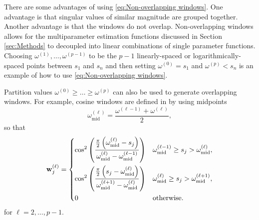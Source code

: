 \documentclass[12pt]{article}
\newcommand{\wVec}{\mathbf{w}}	%
\newcommand{\partition}{\omega}  %
\newcommand{\midpoint}{\partition_{\text{mid}}}   %
\newcommand{\singular}{s}	%
\begin{document}
There are some advantages of using \eqref{eq:Non-overlapping windows}. One advantage is that singular values of similar magnitude are grouped together. Another advantage is that the windows do not overlap. Non-overlapping windows allows for the multiparameter estimation functions discussed in Section \ref{sec:Methods} to decoupled into linear combinations of single parameter functions. Choosing $\partition^{(1)},\ldots,\partition^{(p-1)}$ to be the $p-1$ linearly-spaced or logarithmically-spaced points between $\singular_1$ and $\singular_n$ and then setting $\partition^{(0)} = \singular_1$ and $\partition^{(p)} < \singular_n$ is an example of how to use \eqref{eq:Non-overlapping windows}. \par 
Partition values $\partition^{(0)} \geq \ldots \geq \partition^{(p)}$ can also be used to generate overlapping windows. For example, cosine windows are defined in \cite{ChungEasleyOLeary} by using midpoints
\[\midpoint^{(\ell)} = \frac{\partition^{(\ell-1)} + \partition^{(\ell)}}{2},\] 
so that
\begin{equation}
    \wVec_j^{(\ell)} = \begin{dcases}
    \cos^2\left(\frac{\frac{\pi}{2}\left(\midpoint^{(\ell)} - \singular_j\right)}{\midpoint^{(\ell)} - \midpoint^{(\ell-1)}}\right) & \midpoint^{(\ell-1)} \geq \singular_j > \midpoint^{(\ell)}, \\
    \cos^2\left(\frac{\frac{\pi}{2}\left(\singular_j - \midpoint^{(\ell)}\right)}{\midpoint^{(\ell+1)} - \midpoint^{(\ell)}}\right) & \midpoint^{(\ell)} \geq \singular_j > \midpoint^{(\ell+1)}, \\
    0 & \text{otherwise.}
    \end{dcases}
\end{equation}
for $\ell = 2,\ldots,p-1$.
\end{document}

